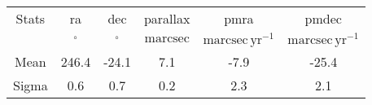 \begin{table}
\begin{tabular}{cccccc}
Stats & ra & dec & parallax & pmra & pmdec \\
 & $\mathrm{{}^{\circ}}$ & $\mathrm{{}^{\circ}}$ & $\mathrm{marcsec}$ & $\mathrm{marcsec\,yr^{-1}}$ & $\mathrm{marcsec\,yr^{-1}}$ \\
Mean & 246.4 & -24.1 & 7.1 & -7.9 & -25.4 \\
Sigma & 0.6 & 0.7 & 0.2 & 2.3 & 2.1 \\
\end{tabular}
\end{table}
